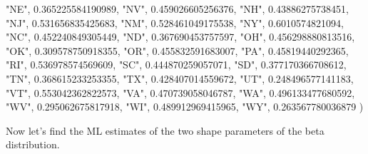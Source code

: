 \documentclass[
]{book}
\newenvironment{Shaded}{\begin{snugshade}}{\end{snugshade}}
\newcommand{\FloatTok}[1]{\textcolor[rgb]{0.00,0.00,0.81}{#1}}
\newcommand{\NormalTok}[1]{#1}
\newcommand{\StringTok}[1]{\textcolor[rgb]{0.31,0.60,0.02}{#1}}
\begin{document}
\begin{Shaded}
\begin{Highlighting}[]
         \StringTok{"NE"}\NormalTok{,   }\FloatTok{0.365225584190989}\NormalTok{,}
         \StringTok{"NV"}\NormalTok{,   }\FloatTok{0.459026605256376}\NormalTok{,}
         \StringTok{"NH"}\NormalTok{,    }\FloatTok{0.43886275738451}\NormalTok{,}
         \StringTok{"NJ"}\NormalTok{,   }\FloatTok{0.531656835425683}\NormalTok{,}
         \StringTok{"NM"}\NormalTok{,   }\FloatTok{0.528461049175538}\NormalTok{,}
         \StringTok{"NY"}\NormalTok{,     }\FloatTok{0.6010574821094}\NormalTok{,}
         \StringTok{"NC"}\NormalTok{,   }\FloatTok{0.452240849305449}\NormalTok{,}
         \StringTok{"ND"}\NormalTok{,   }\FloatTok{0.367690453757597}\NormalTok{,}
         \StringTok{"OH"}\NormalTok{,   }\FloatTok{0.456298880813516}\NormalTok{,}
         \StringTok{"OK"}\NormalTok{,   }\FloatTok{0.309578750918355}\NormalTok{,}
         \StringTok{"OR"}\NormalTok{,   }\FloatTok{0.455832591683007}\NormalTok{,}
         \StringTok{"PA"}\NormalTok{,    }\FloatTok{0.45819440292365}\NormalTok{,}
         \StringTok{"RI"}\NormalTok{,   }\FloatTok{0.536978574569609}\NormalTok{,}
         \StringTok{"SC"}\NormalTok{,   }\FloatTok{0.444870259057071}\NormalTok{,}
         \StringTok{"SD"}\NormalTok{,   }\FloatTok{0.377170366708612}\NormalTok{,}
         \StringTok{"TN"}\NormalTok{,   }\FloatTok{0.368615233253355}\NormalTok{,}
         \StringTok{"TX"}\NormalTok{,   }\FloatTok{0.428407014559672}\NormalTok{,}
         \StringTok{"UT"}\NormalTok{,   }\FloatTok{0.248496577141183}\NormalTok{,}
         \StringTok{"VT"}\NormalTok{,   }\FloatTok{0.553042362822573}\NormalTok{,}
         \StringTok{"VA"}\NormalTok{,   }\FloatTok{0.470739058046787}\NormalTok{,}
         \StringTok{"WA"}\NormalTok{,   }\FloatTok{0.496133477680592}\NormalTok{,}
         \StringTok{"WV"}\NormalTok{,   }\FloatTok{0.295062675817918}\NormalTok{,}
         \StringTok{"WI"}\NormalTok{,   }\FloatTok{0.489912969415965}\NormalTok{,}
         \StringTok{"WY"}\NormalTok{,   }\FloatTok{0.263567780036879}
\NormalTok{  )}
\end{Highlighting}
\end{Shaded}

Now let's find the ML estimates of the two shape parameters of the beta
distribution.
\end{document}
